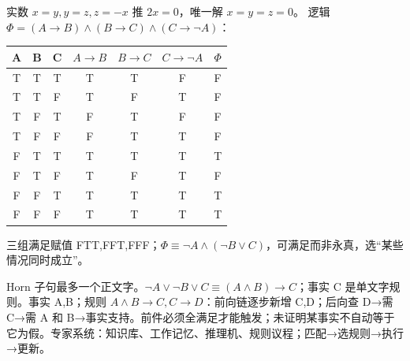 实数 $x=y,y=z,z=-x$ 推 $2x=0$，唯一解 $x=y=z=0$。
逻辑 $\Phi=(A\to B)\land(B\to C)\land(C\to\neg A)$：
\begin{center}\begin{tabular}{ccc|ccc|c}\toprule
A&B&C&$A\to B$&$B\to C$&$C\to\neg A$&$\Phi$\\\midrule
T&T&T&T&T&F&F\\T&T&F&T&F&T&F\\T&F&T&F&T&F&F\\T&F&F&F&T&T&F\\
F&T&T&T&T&T&T\\F&T&F&T&F&T&F\\F&F&T&T&T&T&T\\F&F&F&T&T&T&T\\\bottomrule
\end{tabular}\end{center}
三组满足赋值 FTT,FFT,FFF；$\Phi\equiv\neg A\land(\neg B\lor C)$，可满足而非永真，选“某些情况同时成立”。

Horn 子句最多一个正文字。$\neg A\lor\neg B\lor C\equiv(A\land B)\to C$；事实 C 是单文字规则。事实 A,B；规则 $A\land B\to C,C\to D$：前向链逐步新增 C,D；后向查 D→需 C→需 A 和 B→事实支持。前件必须全满足才能触发；未证明某事实不自动等于它为假。专家系统：知识库、工作记忆、推理机、规则议程；匹配→选规则→执行→更新。
